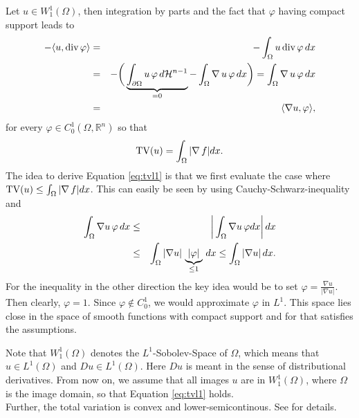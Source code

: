     \begin{example} %
    \label{prop:u_is_smooth}

        Let $u \in W_{1}^{1}(\Omega)$, then integration by parts and the fact that $\varphi$ having compact support leads to
            \begin{eqnarray}
                -\langle u, \textnormal{div}\,\varphi \rangle &=& - \int_{\Omega} u\, \textnormal{div}\, \varphi\, dx \notag \\
                &=& - \bigg( \underbrace{\int_{\partial\Omega} u\, \varphi\, d\mathcal{H}^{n-1}}_{= 0} - \int_{\Omega} \nabla\,u\, \varphi\, dx \bigg) = \int_{\Omega} \nabla\,u\,\varphi\,dx \notag \\
                &=& \langle \nabla u, \varphi \rangle,
                \label{eq:nabla_equals_minus_divergence}
            \end{eqnarray}
        for every $\varphi \in C^{1}_{0}(\Omega, \mathbb{R}^{n})$ so that
            \begin{equation}
                \textnormal{TV}(u) = \int_{\Omega} |\nabla\,f| dx.
                \label{eq:tvl1}
            \end{equation}
        The idea to derive Equation \ref{eq:tvl1} is that we first evaluate the case where\\
        $\textnormal{TV}(u) \le \int_{\Omega} |\nabla\,f| dx$. This can easily be seen by using Cauchy-Schwarz-inequality and
            \begin{eqnarray}
                \int_{\Omega} \nabla u \, \varphi \, dx &\le& \bigg| \int_{\Omega} \nabla u \, \varphi dx \bigg| \, dx \notag \\
                &\le& \int_{\Omega} |\nabla u| \, \underbrace{|\varphi|}_{\le 1} \, dx \le \int_{\Omega} |\nabla u| \, dx.
            \end{eqnarray}
        For the inequality in the other direction the key idea would be to set $\varphi = \frac{\nabla u}{|\nabla u|}$. Then clearly, $\varphi = 1$. Since $\varphi \notin C_{0}^{1}$, we would approximate $\varphi$ in $L^{1}$. This space lies close in the space of smooth functions with compact support and for that satisfies the assumptions.

    \end{example}

    \begin{remark}
        Note that $W_{1}^{1}(\Omega)$ denotes the $L^{1}$-Sobolev-Space of $\Omega$, which means that $u \in L^{1}(\Omega)$ and $Du \in L^{1}(\Omega)$. Here $Du$ is meant in the sense of distributional derivatives. From now on, we assume that all images $u$ are in $W_{1}^{1}(\Omega)$, where $\Omega$ is the image domain, so that Equation \ref{eq:tvl1} holds. \\
        Further, the total variation is convex and lower-semicontinous. See \cite{Chambolle-et-al-10} for details.
    \end{remark}

